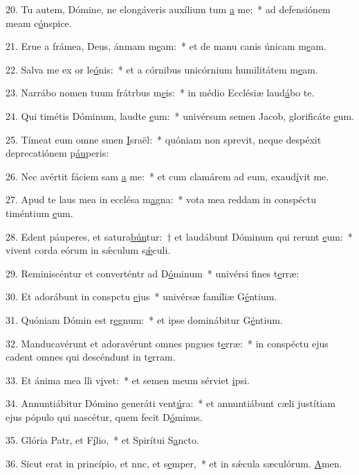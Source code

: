 20. Tu autem, Dómine, ne elongáveris auxílium tum \uline{a} me:~* ad defensiónem meam c\uline{ó}nspice.\par 
21. Erue a frámea, Deus, ánmam m\uline{e}am:~* et de manu canis únicam m\uline{e}am.\par 
22. Salva me ex or le\uline{ó}nis:~* et a córnibus unicórnium humilitátem m\uline{e}am.\par 
23. Narrábo nomen tuum frátrbus m\uline{e}is:~* in médio Ecclésiæ laud\uline{á}bo te.\par 
24. Qui timétis Dóminum, laudte \uline{e}um:~* univérsum semen Jacob, glorificáte \uline{e}um.\par 
25. Tímeat eum omne smen \uline{I}sraël:~* quóniam non sprevit, neque despéxit deprecatiónem p\uline{áu}peris:\par 
26. Nec avértit fáciem sam \uline{a} me:~* et cum clamárem ad eum, exaud\uline{í}vit me.\par 
27. Apud te laus mea in ecclésa m\uline{a}gna:~* vota mea reddam in conspéctu timéntium \uline{e}um.\par 
28. Edent páuperes, et satura\uline{bún}tur:~† et laudábunt Dóminum qui rerunt \uline{e}um:~* vivent corda eórum in sǽculum s\uline{ǽ}culi.\par 
29. Reminiscéntur et converténtr ad D\uline{ó}minum~* univérsi fines t\uline{e}rræ:\par 
30. Et adorábunt in conspctu \uline{e}jus~* univérsæ famíliæ G\uline{é}ntium.\par 
31. Quóniam Dómin est r\uline{e}gnum:~* et ipse dominábitur G\uline{é}ntium.\par 
32. Manducavérunt et adoravérunt omnes pngues t\uline{e}rræ:~* in conspéctu ejus cadent omnes qui descéndunt in t\uline{e}rram.\par 
33. Et ánima mea lli v\uline{i}vet:~* et semen meum sérviet \uline{i}psi.\par 
34. Annuntiábitur Dómino generáti vent\uline{ú}ra:~* et annuntiábunt cæli justítiam ejus pópulo qui nascétur, quem fecit D\uline{ó}minus.\par 
35. Glória Patr, et F\uline{í}lio,~* et Spirítui S\uline{a}ncto.\par 
36. Sicut erat in princípio, et nnc, et s\uline{e}mper,~* et in sǽcula sæculórum. \uline{A}men.\par 
